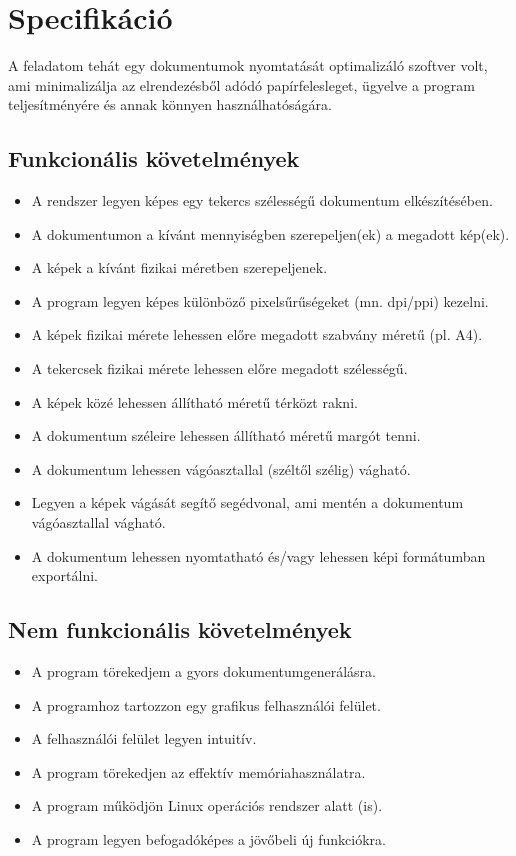 \chapter{Specifikáció}

A feladatom tehát egy dokumentumok nyomtatását optimalizáló szoftver volt, ami minimalizálja az elrendezésből adódó papírfelesleget, ügyelve a program teljesítményére és annak könnyen használhatóságára.

\section{Funkcionális követelmények}
\begin{itemize}
    \item A rendszer legyen képes egy tekercs szélességű dokumentum elkészítésében.
    \item A dokumentumon a kívánt mennyiségben szerepeljen(ek) a megadott kép(ek).
    \item A képek a kívánt fizikai méretben szerepeljenek.
    \item A program legyen képes különböző pixelsűrűségeket (mn. dpi/ppi) kezelni.
    \item A képek fizikai mérete lehessen előre megadott szabvány méretű (pl. A4).
    \item A tekercsek fizikai mérete lehessen előre megadott szélességű.
    \item A képek közé lehessen állítható méretű térközt rakni.
    \item A dokumentum széleire lehessen állítható méretű margót tenni.
    \item A dokumentum lehessen vágóasztallal (széltől szélig) vágható.
    \item Legyen a képek vágását segítő segédvonal, ami mentén a dokumentum vágóasztallal vágható.
    \item A dokumentum lehessen nyomtatható és/vagy lehessen képi formátumban exportálni.
\end{itemize}

\section{Nem funkcionális követelmények}
\begin{itemize}
    \item A program törekedjem a gyors dokumentumgenerálásra. 
    \item A programhoz tartozzon egy grafikus felhasználói felület.
    \item A felhasználói felület legyen intuitív.
    \item A program törekedjen az effektív memóriahasználatra.
    \item A program működjön Linux operációs rendszer alatt (is).
    \item A program legyen befogadóképes a jövőbeli új funkciókra.
\end{itemize}